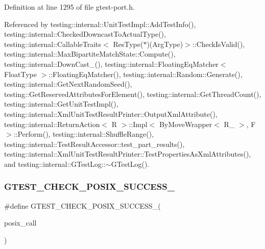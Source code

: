 Definition at line 1295 of file gtest-\/port.\+h.



Referenced by testing\+::internal\+::\+Unit\+Test\+Impl\+::\+Add\+Test\+Info(), testing\+::internal\+::\+Checked\+Downcast\+To\+Actual\+Type(), testing\+::internal\+::\+Callable\+Traits$<$ Res\+Type($\ast$)(\+Arg\+Type)$>$\+::\+Check\+Is\+Valid(), testing\+::internal\+::\+Max\+Bipartite\+Match\+State\+::\+Compute(), testing\+::internal\+::\+Down\+Cast\+\_\+(), testing\+::internal\+::\+Floating\+Eq\+Matcher$<$ Float\+Type $>$\+::\+Floating\+Eq\+Matcher(), testing\+::internal\+::\+Random\+::\+Generate(), testing\+::internal\+::\+Get\+Next\+Random\+Seed(), testing\+::\+Get\+Reserved\+Attributes\+For\+Element(), testing\+::internal\+::\+Get\+Thread\+Count(), testing\+::internal\+::\+Get\+Unit\+Test\+Impl(), testing\+::internal\+::\+Xml\+Unit\+Test\+Result\+Printer\+::\+Output\+Xml\+Attribute(), testing\+::internal\+::\+Return\+Action$<$ R $>$\+::\+Impl$<$ By\+Move\+Wrapper$<$ R\+\_\+ $>$, F $>$\+::\+Perform(), testing\+::internal\+::\+Shuffle\+Range(), testing\+::internal\+::\+Test\+Result\+Accessor\+::test\+\_\+part\+\_\+results(), testing\+::internal\+::\+Xml\+Unit\+Test\+Result\+Printer\+::\+Test\+Properties\+As\+Xml\+Attributes(), and testing\+::internal\+::\+G\+Test\+Log\+::$\sim$\+G\+Test\+Log().

\mbox{\label{gtest-port_8h_a38f6151210e363ad7c69a836b13cf0af}} 
\subsubsection{\texorpdfstring{G\+T\+E\+S\+T\+\_\+\+C\+H\+E\+C\+K\+\_\+\+P\+O\+S\+I\+X\+\_\+\+S\+U\+C\+C\+E\+S\+S\+\_\+}{GTEST\_CHECK\_POSIX\_SUCCESS\_}}
{\footnotesize\ttfamily \#define G\+T\+E\+S\+T\+\_\+\+C\+H\+E\+C\+K\+\_\+\+P\+O\+S\+I\+X\+\_\+\+S\+U\+C\+C\+E\+S\+S\+\_\+(\begin{DoxyParamCaption}\item[{}]{posix\+\_\+call }\end{DoxyParamCaption})}

